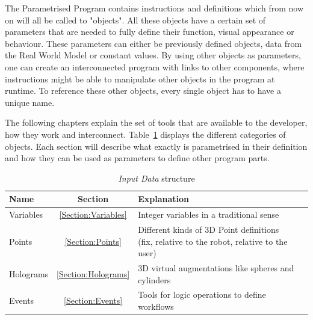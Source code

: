 
The Parametrised Program contains instructions and definitions which from now on will all be called to "objects". All these objects have a certain set of parameters that are needed to fully define their function, visual appearance or behaviour. These parameters can either be previously defined objects, data from the Real World Model or constant values. By using other objects as parameters, one can create an interconnected program with links to other components, where instructions might be able to manipulate other objects in the program at runtime. To reference these other objects, every single object has to have a unique name.

The following chapters explain the set of tools that are available to the developer, how they work and interconnect. Table~\ref{Table:InputDataStructure} displays the different categories of objects. Each section will describe what exactly is parametrised in their definition and how they can be used as parameters to define other program parts.

\begin{table}[ht]
	\caption{\textit{Input Data} structure}
	\label{Table:InputDataStructure}
	\centering
	\begin{tabular}{lcl}
		\toprule
		Name & Section		& Explanation	\\		
		\midrule
		Variables & \ref{Section:Variables}		& Integer variables in a traditional sense \\
		Points& \ref{Section:Points}		& \parbox[t]{10cm}{Different kinds of 3D Point definitions\\(fix, relative to the robot, relative to the user)} 	 \\
		Holograms& \ref{Section:Holograms} & 3D virtual augmentations like spheres and cylinders\\
		Events& \ref{Section:Events} & Tools for logic operations to define workflows \\
		\bottomrule
	\end{tabular}
\end{table}

